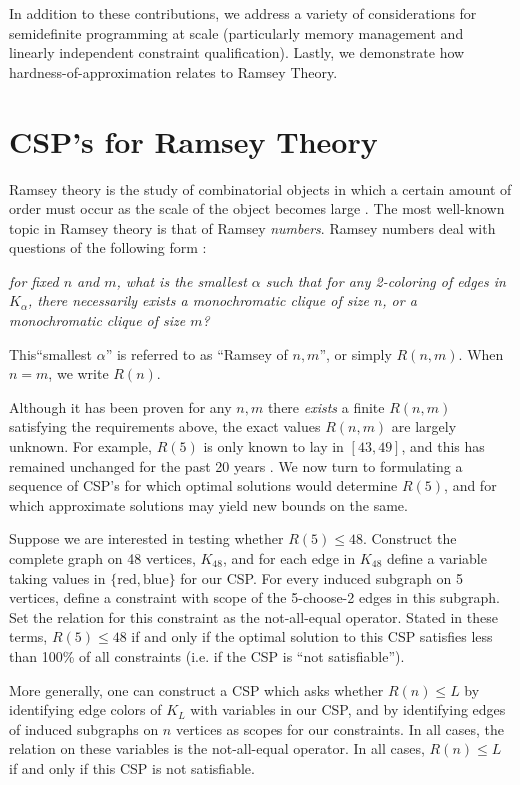 \documentclass[12pt]{article} %
\begin{document}
In addition to these contributions, we address a variety of considerations for semidefinite programming at scale (particularly memory management and linearly independent constraint qualification). Lastly, we demonstrate how hardness-of-approximation relates to Ramsey Theory.


\section{CSP's for Ramsey Theory}
Ramsey theory is the study of combinatorial objects in which a certain amount of order must occur as the scale of the object becomes large \cite{rt}. The most well-known topic in Ramsey theory is that of Ramsey \textit{numbers}. Ramsey numbers deal with questions of the following form : 

\vspace{1em}
\noindent \textit{for fixed $n$ and $m$, what is the smallest $\alpha$ such that for \textit{any} 2-coloring of edges in $K_\alpha$, there necessarily exists a monochromatic clique of size $n$, or a monochromatic clique of size $m$?}
\vspace{1em}

This``smallest $\alpha$'' is referred to as ``Ramsey of $n,m$'', or simply $R(n,m)$. When $n = m$, we write $R(n)$.

Although it has been proven for any $n,m$ there \textit{exists} a finite $R(n,m)$ satisfying the requirements above, the exact values $R(n,m)$ are largely unknown. For example, $R(5)$ is only known to lay in $[43,49]$, and this has remained unchanged for the past 20 years \cite{rn}. We now turn to formulating a sequence of CSP's for which optimal solutions would determine $R(5)$, and for which approximate solutions may yield new bounds on the same.

Suppose we are interested in testing whether $R(5) \leq 48$. Construct the complete graph on 48 vertices, $K_{48}$, and for each edge in $K_{48}$ define a variable taking values in $\{\text{red},\text{blue}\}$ for our CSP. For every induced subgraph on 5 vertices, define a constraint with scope of the 5-choose-2 edges in this subgraph. Set the relation for this constraint as the not-all-equal operator. Stated in these terms, $R(5) \leq 48$ if and only if the optimal solution to this CSP satisfies less than 100\% of all constraints (i.e. if the CSP is ``not satisfiable'').

More generally, one can construct a CSP which asks whether $R(n) \leq L$ by identifying edge colors of $K_L$ with variables in our CSP, and by identifying edges of induced subgraphs on $n$ vertices as scopes for our constraints. In all cases, the relation on these variables is the not-all-equal operator. In all cases, $R(n) \leq L$ if and only if this CSP is not satisfiable.
\end{document}
